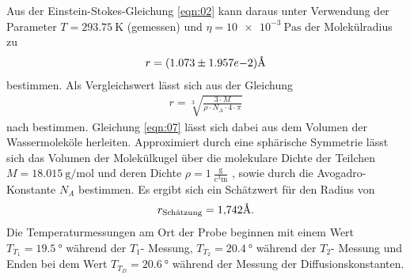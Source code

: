 \noindent Aus der Einstein-Stokes-Gleichung \ref{eqn:02} kann daraus unter Verwendung der
Parameter $T = \SI{293.75}{\kelvin}$ (gemessen) und $\eta = \SI{10e-3}{\pascal\second}$
\cite{Viskosität_Wasser} der Molekülradius zu
\begin{align*}
 r = (1.073\pm 1.957e{-2}) \text{\r{A}}
\end{align*}
\noindent bestimmen. Als Vergleichswert lässt sich aus der Gleichung
\begin{align}
  r = \sqrt[3]{\frac{3 \cdot M}{\rho \cdot N_A \cdot 4 \cdot \pi}}
  \label{eqn:07}
\end{align}
\noindent nach \cite{radius} bestimmen. Gleichung \ref{eqn:07} lässt sich dabei
aus dem Volumen der Wassermoleköle herleiten. Approximiert durch eine sphärische
Symmetrie lässt sich das Volumen der Molekülkugel über die molekulare
Dichte der Teilchen $M = \SI{18.015}{\gram\per\mol}$
und deren Dichte $\rho = 1 \: \frac{\si{\gram}}{\si{\cubic\centi\meter}}$
\cite{Viskosität_Wasser}, sowie durch die Avogadro-Konstante $N_A$ bestimmen.
Es ergibt sich ein Schätzwert für den Radius von
\begin{align*}
  r_\text{Schätzung} = \num{1.742} \text{\r{A}}.
\end{align*}
\noindent Die Temperaturmessungen am Ort der Probe beginnen mit einem Wert
$T_{T_1} = \SI{19.5}{\degree}$ während der $T_1$- Messung,
$T_{T_2} = \SI{20.4}{\degree}$ während der $T_2$- Messung und Enden bei dem Wert
$T_{T_D} = \SI{20.6}{\degree}$ während der Messung der Diffusionskonstanten.

